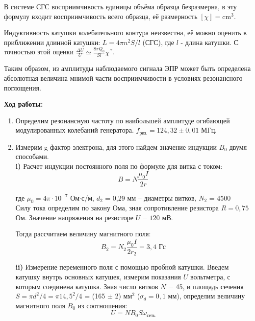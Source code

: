 \documentclass[a4paper, 12pt]{article}%
\begin{document}
	В системе СГС восприимчивость единицы объёма образца безразмерна, в эту формулу входит восприимчивость всего образца, её размерность $[\chi]=\mathrm{cm}^3$.
	
	Индуктивность катушки колебательного контура неизвестна, её можно оценить в приближении длинной катушки: $L=4 \pi n^2 S / l$ (СГС), где $l$ - длина катушки. С точностью этой оценки $\frac{\Delta U}{U} \simeq \frac{8 \pi Q_0}{S l} \chi^{\prime \prime}$.
	
	Таким образом, из амплитуды наблюдаемого сигнала ЭПР может быть определена абсолютная величина мнимой части восприимчивости в условиях резонансного поглощения.
	
	\newpage 
	
	\textbf{Ход работы: }\\
	
	\begin{enumerate}
		
		\item Определим резонансную частоту по наибольшей амплитуде огибающей модулированных колебаний генератора. $f_{\text{рез.}} = 124,32 \pm 0,01$ МГц.
		
		\item Измерим g-фактор электрона, для этого найдем значение индукции $B_0$ двумя способами. \\
		
		\textbf{i)} Расчет индукции постоянного поля по формуле для витка с током: 
		$$B= N\frac{\mu_0 I}{2r} $$
		
		где $\mu_0 = 4\pi \cdot 10^{-7}$ Ом$\cdot$с/м, $d_2$ = 0,29 мм -- диаметры витков,  $N_2$ = 4500\\
		Силу тока определим по закону Ома, зная сопротивление резистора $R = 0,75$ Ом. Значение напряжения на резисторе $U = 120$ мВ.
		
		Тогда рассчитаем величину магнитного поля:
		$$ B_2 = N_2\frac{\mu_0 I}{2r_2} = 3,4 \text{ Гс}$$
				
		\textbf{ii)} Измерение переменного поля с помощью пробной катушки. Введем катушку внутрь основных катушек, измерим показания $U$ вольтметра, с которым соединена катушка. Зная число витков $N$ = 45, и площадь сечения $S = \pi d^2/4 = \pi 14,5^2 / 4 $ = (165 $\pm$ 2) мм$^2$ ($\sigma_d = 0,1$ мм), определим величину магнитного поля $B_0$ из соотношения:
		$$ U = NB_0S\omega_{\text{сеть}} $$
		

\end{enumerate}
\end{document}
